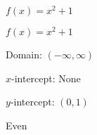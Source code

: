 {$f(x) = x^2 + 1$}
{$f(x) = x^2+1$

Domain: $(-\infty, \infty)$ 

$x$-intercept: None

$y$-intercept: $\left(0, 1 \right)$ 

Even

\begin{center}
\end{center}
}